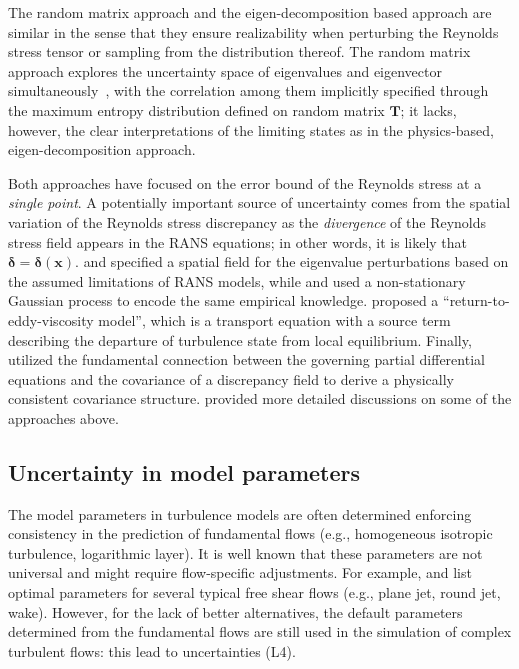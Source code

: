 \documentclass[a4paper]{ar-1col}
\begin{document}
The random matrix approach and the eigen-decomposition based approach are similar in the sense that they ensure  realizability when perturbing the Reynolds stress tensor or sampling from the distribution thereof. The random matrix  approach explores the uncertainty space of eigenvalues and eigenvector simultaneously~\citep{wang2016quantification}, with the correlation among them implicitly specified through the maximum entropy distribution defined on random matrix $\bm{T}$; it  lacks, however, the clear interpretations of the limiting states as in the physics-based, eigen-decomposition approach.

Both  approaches have focused on the error bound of the Reynolds stress at a \emph{single point}.
 A potentially important source of uncertainty comes from the spatial variation of the Reynolds stress discrepancy as the \emph{divergence} of the Reynolds stress field  appears in the RANS  equations; in other words, it is likely that $\bm{\delta}=\bm{\delta}(\bm {x})$. 
  \cite{emory2013modeling} and  \citet{gorle2014deviation} specified a spatial field for the eigenvalue perturbations based on the assumed limitations 
   of  RANS models, while  \citet{wang2016incorporating} and \cite{xiao2017random} used a non-stationary Gaussian process to encode the same empirical knowledge.
\citet{edeling2017data-free} proposed a ``return-to-eddy-viscosity model'', which is a transport equation with a source term describing the departure of turbulence state from local equilibrium. 
Finally, \citet{wu2018pde-informed} utilized the fundamental connection between the governing partial differential equations and the covariance  of a discrepancy field to derive a physically consistent covariance structure.
\citet{xiao2018quantifying} provided more detailed discussions on some of the approaches above.

\subsection{Uncertainty in model parameters}

The model parameters in turbulence models are often determined enforcing consistency in the prediction of fundamental flows (e.g., homogeneous isotropic turbulence, logarithmic layer). It is well known that these parameters are not universal and might require flow-specific adjustments. For example, \citet{pope2000turbulent} and \citet{eisfeld2017reynolds}  list  optimal parameters for several typical free shear flows (e.g., plane jet, round jet, wake). However, for the lack of better alternatives, the default parameters determined from the fundamental flows are still used in the simulation of complex turbulent flows: this lead to uncertainties (L4).
\end{document}
